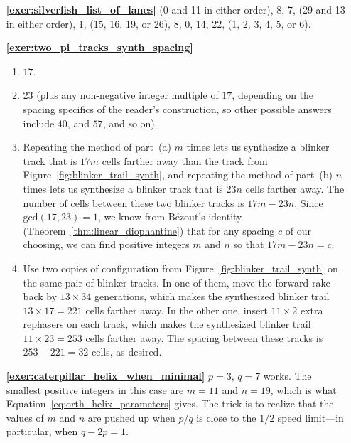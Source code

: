\begin{multicols}{2}
\begin{itemize}[leftmargin=0em]
	
		\item[\bf\color{ocre}\sffamily\ref{exer:silverfish_list_of_lanes}] (0 and 11 in either order), 8, 7, (29 and 13 in either order), 1, (15, 16, 19, or 26), 8, 0, 14, 22, (1, 2, 3, 4, 5, or 6).\\
	

		\item[\bf\color{ocre}\sffamily\ref{exer:two_pi_tracks_synth_spacing}] \begin{enumerate}[leftmargin=1.5em,label=\bf\color{ocre}(\alph*)]
			\item $17$.
			
			\item $23$ (plus any non-negative integer multiple of $17$, depending on the spacing specifics of the reader's construction, so other possible answers include $40$, and $57$, and so on).
			
			\item Repeating the method of part~(a) $m$ times lets us synthesize a blinker track that is $17m$ cells farther away than the track from Figure~\ref{fig:blinker_trail_synth}, and repeating the method of part~(b) $n$ times lets us synthesize a blinker track that is $23n$ cells farther away. The number of cells between these two blinker tracks is $17m - 23n$. Since $\mathrm{gcd}(17,23) = 1$, we know from B\'ezout's identity (Theorem~\ref{thm:linear_diophantine}) that for any spacing $c$ of our choosing, we can find positive integers $m$ and $n$ so that $17m - 23n = c$.
			
			\item Use two copies of configuration from Figure~\ref{fig:blinker_trail_synth} on the same pair of blinker tracks. In one of them, move the forward rake back by $13\times 34$ generations, which makes the synthesized blinker trail $13 \times 17 = 221$ cells farther away. In the other one, insert $11 \times 2$ extra rephasers on each track, which makes the synthesized blinker trail $11 \times 23 = 253$ cells farther away. The spacing between these tracks is $253 - 221 = 32$ cells, as desired.\\
		\end{enumerate}
	

		\item[\bf\color{ocre}\sffamily\ref{exer:caterpillar_helix_when_minimal}] $p = 3$, $q = 7$ works. The smallest positive integers in this case are $m = 11$ and $n = 19$, which is what Equation~\eqref{eq:orth_helix_parameters} gives. The trick is to realize that the values of $m$ and $n$ are pushed up when $p/q$ is close to the $1/2$ speed limit---in particular, when $q - 2p = 1$.\\
		

\end{itemize}
\end{multicols}
